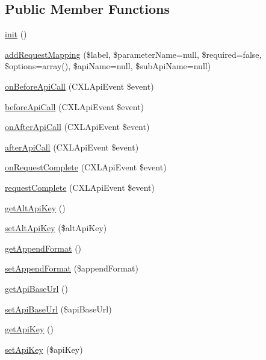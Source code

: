 \subsection*{Public Member Functions}
\begin{DoxyCompactItemize}
\item 
\hyperlink{classCXLApiComponent_a4be4055f3361d4800e16bc2e2e38cda6}{init} ()
\item 
\hyperlink{classCXLApiComponent_a72f783743d37a2e103180fd56a6725b4}{addRequestMapping} (\$label, \$parameterName=null, \$required=false, \$options=array(), \$apiName=null, \$subApiName=null)
\item 
\hyperlink{classCXLApiComponent_a4093b5694f26106f79bb6f49d53056e7}{onBeforeApiCall} (CXLApiEvent \$event)
\item 
\hyperlink{classCXLApiComponent_a28c37737a7bb412c772f935f5084cd8c}{beforeApiCall} (CXLApiEvent \$event)
\item 
\hyperlink{classCXLApiComponent_a5553835ab2c36beb97aa324fd9dc0c8e}{onAfterApiCall} (CXLApiEvent \$event)
\item 
\hyperlink{classCXLApiComponent_ac20611dddb4bc257604af1934e9bb61e}{afterApiCall} (CXLApiEvent \$event)
\item 
\hyperlink{classCXLApiComponent_a6a322883ad1cae03d8d0b1ec577b0b64}{onRequestComplete} (CXLApiEvent \$event)
\item 
\hyperlink{classCXLApiComponent_a32f78928ada911ae7ff34f4df1ab6c7f}{requestComplete} (CXLApiEvent \$event)
\item 
\hyperlink{classCXLApiComponent_ac2748791f3cfd9fc147d995920b01181}{getAltApiKey} ()
\item 
\hyperlink{classCXLApiComponent_a305ec5588b0b6a3cb7af1028a5b9a7b1}{setAltApiKey} (\$altApiKey)
\item 
\hyperlink{classCXLApiComponent_a06a40fc56ede1a897eba4f1813339d09}{getAppendFormat} ()
\item 
\hyperlink{classCXLApiComponent_aec22119763ba4fab08836f25fbbf0cdb}{setAppendFormat} (\$appendFormat)
\item 
\hyperlink{classCXLApiComponent_a4d08db742849f4840f97ddf93bece54c}{getApiBaseUrl} ()
\item 
\hyperlink{classCXLApiComponent_a5cd04e298df50da7d6a99d97121808eb}{setApiBaseUrl} (\$apiBaseUrl)
\item 
\hyperlink{classCXLApiComponent_afdd5b6b54737f556694975ca3d93d773}{getApiKey} ()
\item 
\hyperlink{classCXLApiComponent_a418ebc2194526fe95a66e1cd6f808fe3}{setApiKey} (\$apiKey)

\end{DoxyCompactItemize}
